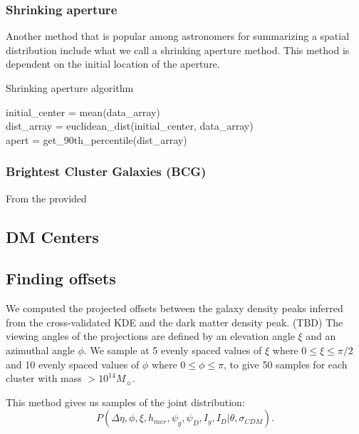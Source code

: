 \documentclass[letterpaper,useAMS,usenatbib]{mn2e}
\begin{document}
\subsubsection{Shrinking aperture}
Another method that is popular among astronomers for summarizing a spatial
distribution include what we call a shrinking aperture method.
This method is dependent on the initial location of the aperture.
\begin{algorithm}
	\caption{Shrinking aperture algorithm}
	 \hrulefill

	initial_center = mean(data\_array)\\
 	dist\_array = euclidean_dist(initial_center, data_array)\\
 	apert = get\_90th\_percentile(dist\_array)\\ 
	   \hrulefill
 \end{algorithm}


\subsubsection{Brightest Cluster Galaxies (BCG)}
From the provided 


\subsection{DM Centers}
\subsection{Finding offsets} 

We computed the projected offsets between the galaxy density peaks inferred from the
cross-validated KDE and the dark matter density peak. (TBD) 
The viewing angles of the projections are defined by an elevation angle
$\xi$ and an azimuthal angle $\phi$. 
We sample at 5 evenly spaced values of $\xi$ where $0 \leq \xi \leq \pi / 2$ and 
10 evenly spaced values of $\phi$ where $0 \leq \phi \leq \pi$, to give 50
samples for each cluster with mass $> 10^{14} M_\sun$. 

This method gives us samples of the joint distribution: 
\begin{equation}
	P(\Delta \eta, \phi, \xi, h_{mer}, \psi_g, \psi_D, I_g, I_D | \theta,
	\sigma_{CDM}). 
\end{equation}
\end{document}
